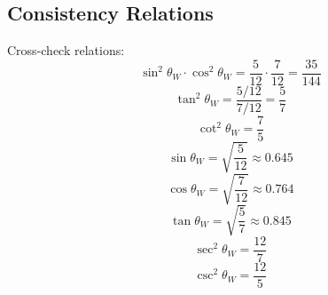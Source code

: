 \documentclass[11pt,a4paper]{article}
\begin{document}
\subsection*{Consistency Relations}
\label{subsec:consistency-rels}

Cross-check relations:
\begin{equation}
\label{eq:consist-1}
\sin^2\theta_W \cdot \cos^2\theta_W = \frac{5}{12} \cdot \frac{7}{12} = \frac{35}{144}
\end{equation}
\begin{equation}
\label{eq:consist-2}
\tan^2\theta_W = \frac{5/12}{7/12} = \frac{5}{7}
\end{equation}
\begin{equation}
\label{eq:consist-3}
\cot^2\theta_W = \frac{7}{5}
\end{equation}
\begin{equation}
\label{eq:consist-4}
\sin\theta_W = \sqrt{\frac{5}{12}} \approx 0.645
\end{equation}
\begin{equation}
\label{eq:consist-5}
\cos\theta_W = \sqrt{\frac{7}{12}} \approx 0.764
\end{equation}
\begin{equation}
\label{eq:consist-6}
\tan\theta_W = \sqrt{\frac{5}{7}} \approx 0.845
\end{equation}
\begin{equation}
\label{eq:consist-7}
\sec^2\theta_W = \frac{12}{7}
\end{equation}
\begin{equation}
\label{eq:consist-8}
\csc^2\theta_W = \frac{12}{5}
\end{equation}
\end{document}
